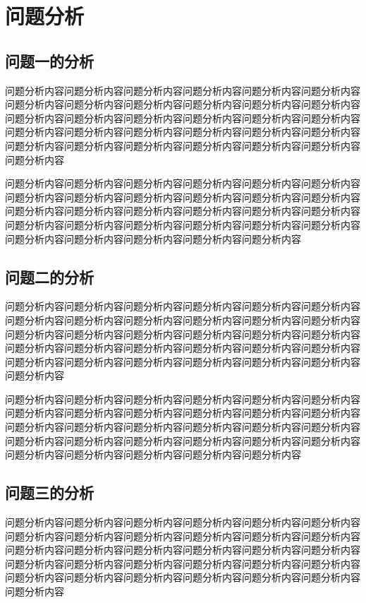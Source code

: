 \section{问题分析}

\subsection{问题一的分析}

问题分析内容问题分析内容问题分析内容问题分析内容问题分析内容问题分析内容问题分析内容问题分析内容问题分析内容问题分析内容问题分析内容问题分析内容问题分析内容问题分析内容问题分析内容问题分析内容问题分析内容问题分析内容问题分析内容问题分析内容问题分析内容问题分析内容问题分析内容问题分析内容问题分析内容问题分析内容问题分析内容问题分析内容问题分析内容问题分析内容问题分析内容

问题分析内容问题分析内容问题分析内容问题分析内容问题分析内容问题分析内容问题分析内容问题分析内容问题分析内容问题分析内容问题分析内容问题分析内容问题分析内容问题分析内容问题分析内容问题分析内容问题分析内容问题分析内容问题分析内容问题分析内容问题分析内容问题分析内容问题分析内容问题分析内容问题分析内容问题分析内容问题分析内容问题分析内容问题分析内容

\subsection{问题二的分析}

问题分析内容问题分析内容问题分析内容问题分析内容问题分析内容问题分析内容问题分析内容问题分析内容问题分析内容问题分析内容问题分析内容问题分析内容问题分析内容问题分析内容问题分析内容问题分析内容问题分析内容问题分析内容问题分析内容问题分析内容问题分析内容问题分析内容问题分析内容问题分析内容问题分析内容问题分析内容问题分析内容问题分析内容问题分析内容问题分析内容问题分析内容

问题分析内容问题分析内容问题分析内容问题分析内容问题分析内容问题分析内容问题分析内容问题分析内容问题分析内容问题分析内容问题分析内容问题分析内容问题分析内容问题分析内容问题分析内容问题分析内容问题分析内容问题分析内容问题分析内容问题分析内容问题分析内容问题分析内容问题分析内容问题分析内容问题分析内容问题分析内容问题分析内容问题分析内容问题分析内容

\subsection{问题三的分析}

问题分析内容问题分析内容问题分析内容问题分析内容问题分析内容问题分析内容问题分析内容问题分析内容问题分析内容问题分析内容问题分析内容问题分析内容问题分析内容问题分析内容问题分析内容问题分析内容问题分析内容问题分析内容问题分析内容问题分析内容问题分析内容问题分析内容问题分析内容问题分析内容问题分析内容问题分析内容问题分析内容问题分析内容问题分析内容问题分析内容问题分析内容

